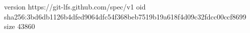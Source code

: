 version https://git-lfs.github.com/spec/v1
oid sha256:3bd6db1126b4dfed9064dfc54f368beb7519b19a618f4d09c32fdcc00ccf8699
size 43860
